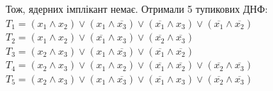 \documentclass[14pt,a4paper]{scrartcl}
\theoremstyle{definition}
\theoremstyle{remark}
\theoremstyle{definition}
\theoremstyle{definition}
\begin{document}
Тож, ядерних імплікант немає. Отримали 5 тупикових ДНФ:\\
$T_1 = (x_1 \land x_2) \lor (x_1 \land \overline{x_3}) \lor (\overline{x_1} \land x_3) \lor (\overline{x_1} \land \overline{x_2}) $\\
$T_2 = (x_1 \land x_2) \lor (\overline{x_1} \land x_3 ) \lor (\overline{x_2}\land \overline{x_3})$\\
$T_3 = (x_2 \land x_3) \lor (x_1 \land \overline{x_3} ) \lor (\overline{x_1} \land \overline{x_2})$\\
$T_4 = (x_2 \land x_3) \lor (x_1 \land x_2 ) \lor (\overline{x_1} \land \overline{x_2}) \lor (\overline{x_2 } \land \overline{x_3})$\\
$T_5 = (x_2 \land x_3) \lor (x_1 \land \overline{ x_3}) \lor (\overline{x_1} \land x_3) \lor (\overline{x_2} \land \overline{x_3})$
 \\
\end{document}
